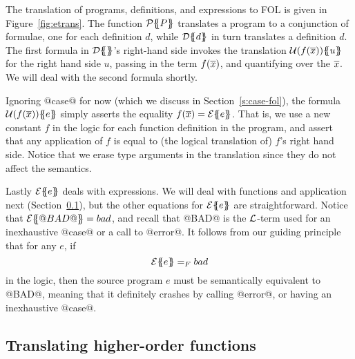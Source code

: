 The translation of programs, definitions, and expressions to FOL
is given in Figure~\ref{fig:etrans}.
The function $\ptrans{}{P}$ translates a program to a conjunction of formulae,
one for each definition $d$, while $\dtrans{}{d}$ in turn translates
a definition $d$.
The first formula in $\dtrans{}{}$'s right-hand side invokes the translation
$\utrans{}{u}{f(\ol{x})}$ for the right hand side $u$, passing in the term $f(\ol{x})$,
and quantifying over the $\ol{x}$.  We will deal with the second formula shortly.


Ignoring @case@ for now (which we discuss in Section~\ref{s:case-fol}),
the formula $\utrans{}{e}{f(\ol{x})}$
simply asserts the equality $f(\ol{x}) = \etrans{}{}{e}$.
That is, we use a new constant $f$ in the logic for each function definition in the
program, and assert that any application of $f$ is equal to (the logical translation of)
$f$'s right hand side. Notice that we erase type arguments in the translation
since they do not affect the semantics.

Lastly $\etrans{}{}{e}$ deals with expressions.  We will deal with
functions and application next
(Section~\ref{s:hof}), but the other equations for $\etrans{}{}{e}$
are straightforward.  Notice that $\etrans{}{}{@BAD@} = bad$, and recall
that @BAD@ is the $\cal L$-term used for an inexhaustive @case@ or a call
to @error@.  It follows from our guiding principle
that for any $e$, if
$$ \etrans{}{}{e} =_F bad $$
in the logic, then the source program $e$
must be semantically equivalent to @BAD@, meaning that it definitely
crashes by calling @error@, or having an inexhaustive @case@.


\subsection{Translating higher-order functions} \label{s:hof}

